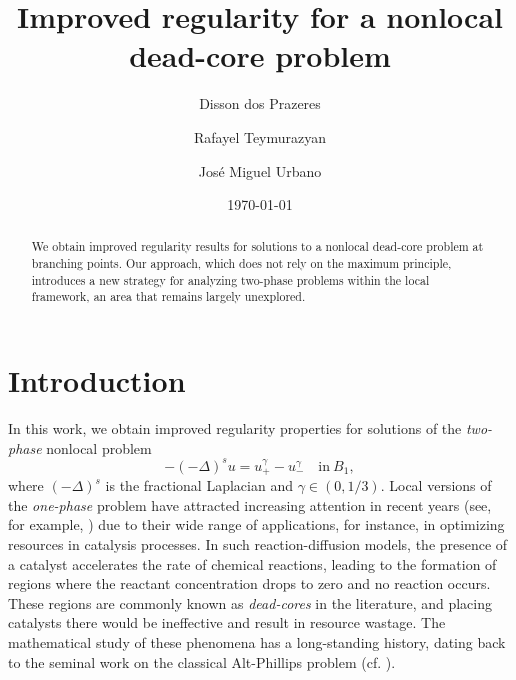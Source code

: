 \documentclass[11pt,reqno]{amsart}
\title[A nonlocal dead-core problem]{Improved regularity for a nonlocal dead-core problem}
\author[D. Prazeres]{Disson dos Prazeres}
\author[R. Teymurazyan]{Rafayel Teymurazyan}
\author[J.M.~Urbano]{Jos\'{e} Miguel Urbano}
\numberwithin{equation}{section}
\numberwithin{theorem}{section}
\numberwithin{lemma}{section}
\numberwithin{corollary}{section}
\numberwithin{remark}{section}
\numberwithin{proposition}{section}
\numberwithin{definition}{section}
\begin{document}






\begin{abstract} 
We obtain improved regularity results for solutions to a nonlocal dead-core problem at branching points. Our approach, which does not rely on the maximum principle, introduces a new strategy for analyzing two-phase problems within the local framework, an area that remains largely unexplored.
\end{abstract}  

\date{\today}

\maketitle

\section{Introduction}

In this work, we obtain improved regularity properties for solutions of the \textit{two-phase} nonlocal problem
\begin{equation}\label{equation}
   -(-\Delta)^su=u_+^\gamma-u_-^\gamma \quad \textrm{in} \ B_1,
\end{equation}
where $(-\Delta)^s$ is the fractional Laplacian and $\gamma\in(0,1/3)$. Local versions of the \textit{one-phase} problem have attracted increasing attention in recent years (see, for example, \cite{ALT16, AT24, DT20, T16}) due to their wide range of applications, for instance, in optimizing resources in catalysis processes. In such reaction-diffusion models, the presence of a catalyst accelerates the rate of chemical reactions, leading to the formation of regions where the reactant concentration drops to zero and no reaction occurs. These regions are commonly known as \textit{dead-cores} in the literature, and placing catalysts there would be ineffective and result in resource wastage. The mathematical study of these phenomena has a long-standing history, dating back to the seminal work on the classical Alt-Phillips problem (cf. \cite{AP86, ATU24, P1, P2, WY22, Y13}).
\end{document}
